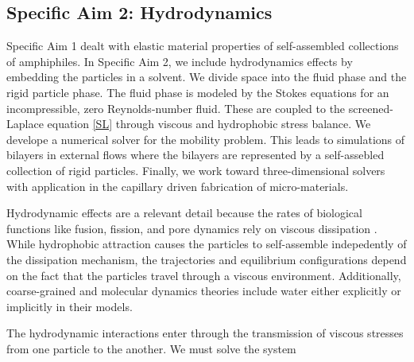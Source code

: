 \subsection{Specific Aim 2: Hydrodynamics}
\label{subsec:specific_aim_2}
Specific Aim 1 dealt with elastic material properties of self-assembled collections of amphiphiles.
In Specific Aim 2, we include hydrodynamics effects by embedding the particles in a solvent. 
We divide space into the fluid phase and the rigid particle phase.
The fluid phase is modeled by the Stokes equations for an incompressible, zero Reynolds-number fluid. These are coupled to the screened-Laplace equation \eqref{SL}
through viscous and hydrophobic stress balance.
We develope a numerical solver for the mobility problem. 
This leads to simulations of bilayers in external flows where the bilayers are represented by a self-assebled collection of rigid particles. 
Finally, we work toward three-dimensional solvers with application in the capillary driven fabrication of micro-materials. 

Hydrodynamic effects are a relevant detail 
because the rates of biological functions like fusion, fission, and pore dynamics rely on viscous dissipation \cite{RYHAM20112929}. 
While hydrophobic attraction causes the particles to self-assemble indepedently of the dissipation mechanism, the trajectories and
equilibrium configurations depend on the fact that the particles travel through a viscous environment. 
Additionally, coarse-grained and molecular dynamics theories include water either explicitly or implicitly in their models. 
 
The hydrodynamic interactions enter through the transmission of viscous stresses from one particle to the another.  
We must solve the system 
\setcounter{midequation}{\theequation}
\addtocounter{midequation}{2}

